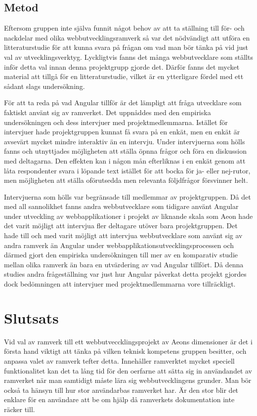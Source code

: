      


\subsection{Metod}

Eftersom gruppen inte själva funnit något behov av att ta ställning till för- och nackdelar med olika webbutvecklingsramverk så var det nödvändigt att utföra en litteraturstudie för att kunna svara på frågan om vad man bör tänka på vid just val av utvecklingsverktyg. Lyckligtvis fanns det många webbutvecklare som ställts inför detta val innan denna projektgrupp gjorde det. Därför fanns det mycket material att tillgå för en litteraturstudie, vilket är en ytterligare fördel med ett sådant slags undersökning.

För att ta reda på vad Angular tillför är det lämpligt att fråga utvecklare som faktiskt använt sig av ramverket. Det uppnåddes med den empiriska undersökningen och dess intervjuer med projektmedlemmarna. Istället för intervjuer hade projektgruppen kunnat få svara på en enkät, men en enkät är avsevärt mycket mindre interaktiv än en intervju. Under intervjuerna som hölls fanns och utnyttjades möjligheten att ställa öpnna frågor och föra en diskussion med deltagarna. Den effekten kan i någon mån efterliknas i en enkät genom att låta respondenter svara i löpande text istället för att bocka för ja- eller nej-rutor, men möjligheten att ställa oförutsedda men relevanta följdfrågor försvinner helt. 

Intervjuerna som hölls var begränsade till medlemmar av projektgruppen. Då det med all sannolikhet fanns andra webbutvecklare som tidigare använt Angular under utveckling av webbapplikationer i projekt av liknande skala som Aeon hade det varit möjligt att intervjua fler deltagare utöver bara projektgruppen. Det hade till och med varit möjligt att intervjua webbutvecklare som använt sig av andra ramverk än Angular under webbapplikationsutvecklingsprocessen och därmed gjort den empiriska undersökningen till mer av en komparativ studie mellan olika ramverk än bara en utvärdering av vad Angular tillfört. Då denna studies andra frågeställning var just hur Angular påverkat detta projekt gjordes dock bedömningen att intervjuer med projektmedlemmarna vore tillräckligt.

\section{Slutsats}

Vid val av ramverk till ett webbutveccklingsprojekt av Aeons dimensioner är det i första hand viktigt att tänka på vilken teknisk kompetens gruppen besitter, och anpassa valet av ramverk tefter detta. Innehåller ramverktet mycket speciell funktionalitet kan det ta lång tid för den oerfarne att sätta sig in användandet av ramverket när man samtidigt måste lära sig webbutvecklingens grunder. Man bör också ta hänsyn till hur stor användarbas ramverket har. Är den stor blir det enklare för en användare att be om hjälp då ramverkets dokumentation inte räcker till.

